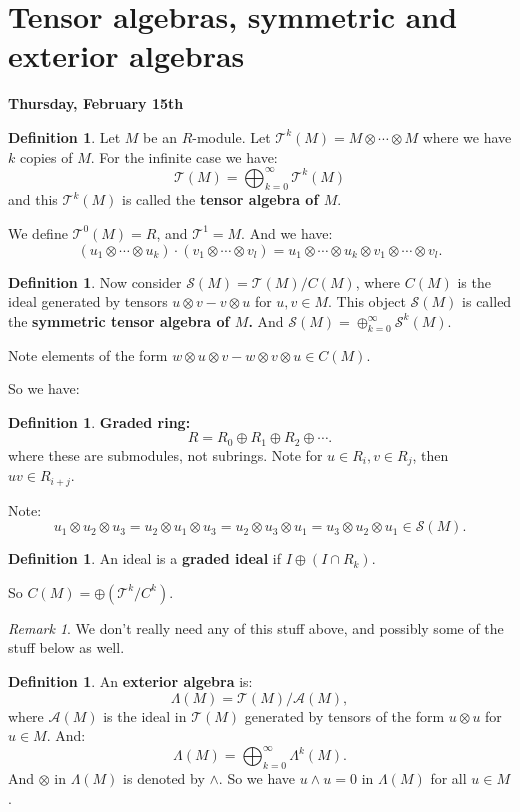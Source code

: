 \documentclass[9pt,reqno,twoside]{amsbook}
\theoremstyle{plain}
\numberwithin{section}{chapter}
\numberwithin{equation}{chapter}
\theoremstyle{definition}
\newtheorem{Def}[theorem]{Definition}
\theoremstyle{remark}
\newtheorem{rem}[theorem]{Remark}
\theoremstyle{plain}
\newcommand{\bb}{\vspace{3mm}}
\newcommand{\mc}{\mathcal}
\newcommand{\tens}{\otimes}
\begin{document}
\section{Tensor algebras, symmetric and exterior algebras}

\textbf{Thursday, February 15th}
\bb
\begin{Def}
Let $M$ be an $R$-module. Let $\mc{T}^k(M) = M \tens \cdots \tens M$ where we have $k$ copies of $M$. For the infinite case we have:
$$
 \mathcal{T}(M) = \bigoplus_{k = 0}^\infty \mathcal{T}^k(M)
 $$
and this $\mathcal{T}^k(M)$ is called the \textbf{tensor algebra of $M$}. 

We define $\mathcal{T}^0(M) = R$, and $\mathcal{T}^1 = M$. And we have:
$$
(u_1 \tens \cdots \tens u_k)\cdot (v_1 \tens \cdots \tens v_l) = u_1 \tens \cdots \tens u_k \tens v_1 \tens \cdots \tens v_l.
$$
\end{Def}


\begin{Def}
Now consider $\mc{S}(M) = \mathcal{T}(M)/C(M)$, where $C(M)$ is the ideal generated by tensors $u \tens v - v \tens u$ for $u,v \in M$. This object $\mc{S}(M)$ is called the \textbf{symmetric tensor algebra of $M$. } And $\mc{S}(M) = \oplus_{k =0}^\infty \mc{S}^k(M)$. 
\end{Def}

Note elements of the form $w \tens u \tens v - w \tens v \tens u \in C(M)$. 

So we have: 

\begin{Def}
\textbf{Graded ring:}
$$
R = R_0 \oplus R_1 \oplus R_2 \oplus \cdots.
$$
where these are submodules, not subrings. Note for $u \in R_i,v \in R_j$, then $uv \in R_{i + j}$. 

Note:
$$
u_1 \tens u_2 \tens u_3 = u_2 \tens u_1 \tens u_3 = u_2 \tens u_3 \tens u_1 = u_3 \tens u_2 \tens u_1 \in \mc{S}(M).
$$


\end{Def}

\begin{Def}
An ideal is a \textbf{graded ideal} if $I\oplus (I \cap R_k)$. 
\end{Def}

So $C(M) = \oplus (\mc{T}^k/C^k)$. 

\begin{rem}
We don't really need any of this stuff above, and possibly some of the stuff below as well. 
\end{rem}

\begin{Def}
An \textbf{exterior algebra} is:
$$
\Lambda(M) = \mc{T}(M)/\mc{A}(M),
$$
where $\mc{A}(M)$ is the ideal in $\mc{T}(M)$ generated by tensors of the form $u \tens u$ for $u \in M$. And:
$$
\Lambda(M) = \bigoplus_{k = 0}^\infty \Lambda^k(M).
$$
And $\tens$ in $\Lambda(M)$ is denoted by $\wedge$. So we have $u \wedge u = 0$ in $\Lambda(M)$ for all $u \in M$. 
\end{Def}
\end{document}
